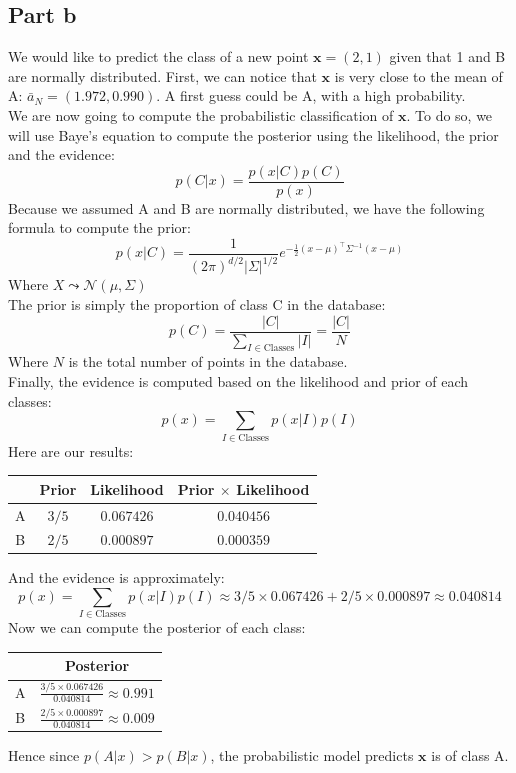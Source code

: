\documentclass[a4paper, 10pt]{article}
\begin{document}
\subsection{Part b}
We would like to predict the class of a new point $\bm{x} = (2,1)$ given that
1 and B are normally distributed. First, we can notice that $\bm{x}$ is very close 
to the mean of A: $\bar{a}_N = (1.972, 0.990)$. A first guess could be A, with a high probability.
\\
We are now going to compute the probabilistic classification of $\bm{x}$. To do so, we will
use Baye's equation to compute the posterior using the likelihood, the prior and the evidence:
$$
p(C\vert x) = \frac{p(x \vert C)p(C)}{p(x)}
$$
Because we assumed A and B are normally distributed, we have the following formula to compute the prior:
$$
p(x\vert C) = \frac{1}{(2\pi)^{d/2}\vert\Sigma\vert^{1/2}}e^{-\frac{1}{2}(x-\mu)^\top\Sigma^{-1}(x-\mu)}
$$
Where $X\leadsto \mathcal{N}(\mu,\Sigma)$
\\
The prior is simply the proportion of class C in the database:
$$
p(C) = \frac{\vert C\vert}{\sum_{I\in \text{Classes}} \vert I\vert} = \frac{\vert C\vert}{N}
$$
Where $N$ is the total number of points in the database.
\\
Finally, the evidence is computed based on the likelihood and prior of each classes:
$$
p(x) = \sum_{I\in \text{Classes}} p(x\vert I)p(I)
$$
Here are our results:
\begin{center}
\begin{tabular}{ |c|c|c|c| }
    \hline
    \  & Prior & Likelihood & Prior $\times$ Likelihood \\
    \hline
    A & $3/5$ & $0.067426$ & $0.040456$\\
    \hline
    B & $2/5$ & $0.000897$ & $0.000359$\\
    \hline
\end{tabular}
\end{center}
And the evidence is approximately:
$$
p(x) =  \sum_{I\in \text{Classes}} p(x\vert I)p(I) \approx 3/5\times 0.067426 + 2/5\times 0.000897 \approx 0.040814
$$
Now we can compute the posterior of each class:
\begin{center}
\begin{tabular}{ |c|c| }
    \hline
    \  & Posterior \\
    \hline
    A & $\frac{3/5\times0.067426}{0.040814}\approx0.991$\\
    \hline
    B & $\frac{2/5\times0.000897}{0.040814}\approx0.009$\\
    \hline
\end{tabular}
\end{center}
Hence since $p(A\vert x) > p(B\vert x)$, the probabilistic model predicts $\bm{x}$ is of class A.
\end{document}
